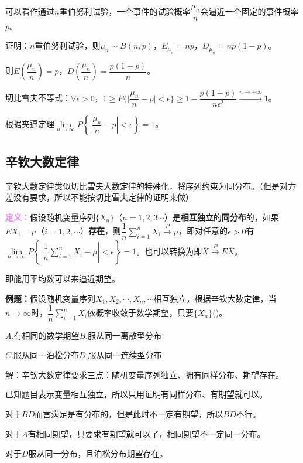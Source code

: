 \documentclass[UTF8, 12pt]{ctexart}
\begin{document}
可以看作通过$n$重伯努利试验，一个事件的试验概率$\dfrac{\mu_n}{n}$会逼近一个固定的事件概率$p$。

证明：$n$重伯努利试验，则$\mu_n\sim B(n,p)$，$E_{\mu_n}=np$，$D_{\mu_n}=np(1-p)$。

则$E\left(\dfrac{\mu_n}{n}\right)=p$，$D\left(\dfrac{\mu_n}{n}\right)=\dfrac{p(1-p)}{n}$。

切比雪夫不等式：$\forall\epsilon>0$，$1\geqslant P\{\vert\dfrac{\mu_n}{n}-p\vert<\epsilon\}\geqslant1-\dfrac{p(1-p)}{n\epsilon^2}\xrightarrow{n\to+\infty}1$。

根据夹逼定理$\lim\limits_{n\to\infty}P\left\{\left\vert\dfrac{\mu_n}{n}-p\right\vert<\epsilon\right\}=1$。

\subsection{辛钦大数定律}

辛钦大数定律类似切比雪夫大数定律的特殊化，将序列约束为同分布。（但是对方差没有要求，所以不能按切比雪夫定律的证明来做）

\textcolor{violet}{\textbf{定义：}}假设随机变量序列$\{X_n\}$（$n=1,2,3\cdots$）是\textbf{相互独立}的\textbf{同分布}的，如果$EX_i=\mu$（$i=1,2,\cdots$）\textbf{存在}，则$\dfrac{1}{n}\sum\limits_{i=1}^nX_i\overset{P}{\longrightarrow}\mu$，即对任意的$\epsilon>0$有$\lim\limits_{n\to\infty}P\left\{\left\vert\dfrac{1}{n}\sum\limits_{i=1}^nX_i-\mu\right\vert<\epsilon\right\}=1$。也可以转换为即$\overline{X}\overset{P}{\rightarrow}E\overline{X}$。\medskip

即能用平均数可以来逼近期望。

\textbf{例题：}假设随机变量序列$X_1,X_2,\cdots,X_n,\cdots$相互独立，根据辛钦大数定律，当$n\to\infty$时，$\dfrac{1}{n}\sum\limits_{i=1}^nX_i$依概率收敛于数学期望，只要$\{X_n\}$()。

$A.$有相同的数学期望\qquad$B.$服从同一离散型分布

$C.$服从同一泊松分布\qquad$D.$服从同一连续型分布

解：辛钦大数定律要求三点：随机变量序列独立、拥有同样分布、期望存在。

已知题目表示变量相互独立，所以只用证明有同样分布、有期望就可以。

对于$BD$而言满足是有分布的，但是此时不一定有期望，所以$BD$不行。

对于$A$有相同期望，只要求有期望就可以了，相同期望不一定同一分布。

对于$D$服从同一分布，且泊松分布期望存在。
\end{document}
